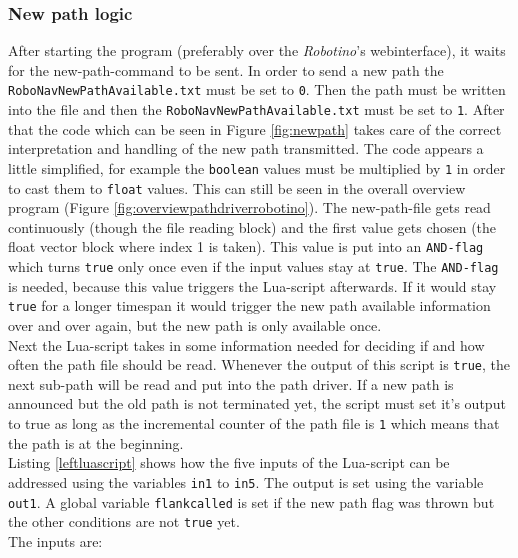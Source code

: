 \subsubsection{New path logic}
After starting the program (preferably over the \textit{Robotino}'s webinterface), it waits for the new-path-command to be sent. In order to send a new path the \\ \texttt{RoboNavNewPathAvailable.txt} must be set to \texttt{0}. Then the path must be written into the file and then the \texttt{RoboNavNewPathAvailable.txt} must be set to \texttt{1}. After that the code which can be seen in Figure \ref{fig:newpath} takes care of the correct interpretation and handling of the new path transmitted. The code appears a little simplified, for example the \texttt{boolean} values must be multiplied by \texttt{1} in order to cast them to \texttt{float} values. This can still be seen in the overall overview program (Figure \ref{fig:overviewpathdriverrobotino}). 
The new-path-file gets read continuously (though the file reading block) and the first value gets chosen (the float vector block where index 1 is taken). This value is put into an \texttt{AND-flag} which turns \texttt{true} only once even if the input values stay at \texttt{true}. The \texttt{AND-flag} is needed, because this value triggers the Lua-script afterwards. If it would stay \texttt{true} for a longer timespan it would trigger the new path available information over and over again, but the new path is only available once.  \\
Next the Lua-script takes in some information needed for deciding if and how often the path file should be read.  Whenever the output of this script is \texttt{true}, the next sub-path will be read and put into the path driver. If a new path is announced but the old path is not terminated yet, the script must set it's output to true as long as the incremental counter of the path file is \texttt{1} which means that the path is at the beginning. \\
Listing \ref{leftluascript} shows how the five inputs of the Lua-script can be addressed using the variables \texttt{in1} to \texttt{in5}. The output is set using the variable \texttt{out1}. A global variable \texttt{flankcalled} is set if the new path flag was thrown but the other conditions are not \texttt{true} yet. \\
The inputs are:

